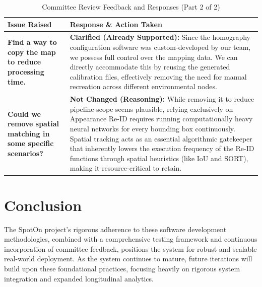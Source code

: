 \begin{table}[!htp]
    \centering
    \caption{Committee Review Feedback and Responses (Part 2 of 2)}
    \renewcommand{\arraystretch}{1.5}
    \begin{tabularx}{\textwidth}{|>{\hsize=0.5\hsize\raggedright}X|>{\hsize=1.5\hsize\raggedright\arraybackslash}X|}
        \hline
        \textbf{Issue Raised} & \textbf{Response \& Action Taken} \\
        \hline
        \textbf{Find a way to copy the map to reduce processing time.} &
        \textbf{Clarified (Already Supported):} Since the homography configuration software was custom-developed by our team, we possess full control over the mapping data. We can directly accommodate this by reusing the generated calibration files, effectively removing the need for manual recreation across different environmental nodes. \\
        \hline
        \textbf{Could we remove spatial matching in some specific scenarios?} &
        \textbf{Not Changed (Reasoning):} While removing it to reduce pipeline scope seems plausible, relying exclusively on Appearance Re-ID requires running computationally heavy neural networks for every bounding box continuously. Spatial tracking acts as an essential algorithmic gatekeeper that inherently lowers the execution frequency of the Re-ID functions through spatial heuristics (like IoU and SORT), making it resource-critical to retain. \\
        \hline
    \end{tabularx}
\end{table}

\section{Conclusion}
The SpotOn project's rigorous adherence to these software development methodologies, combined with a comprehensive testing framework and continuous incorporation of committee feedback, positions the system for robust and scalable real-world deployment. As the system continues to mature, future iterations will build upon these foundational practices, focusing heavily on rigorous system integration and expanded longitudinal analytics.